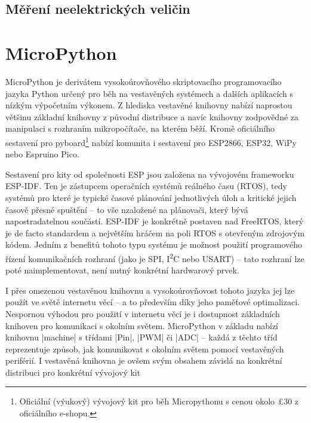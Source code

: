 
\subsection{Měření neelektrických veličin}

\section{MicroPython}\label{sec:micropython}
MicroPython je derivátem vysokoúrovňového skriptovacího programovacího jazyka Python určený pro běh na vestavěných systémech a dalších
aplikacích s nízkým výpočetním výkonem.
Z hlediska vestavěné knihovny nabízí naprostou většinu základní knihovny z původní distribuce a navíc knihovny
zodpovědné za manipulaci s rozhraním mikropočítače, na kterém běží.
Kromě oficiálního sestavení pro pyboard\footnote{Oficiální (výukový) vývojový kit pro běh Micropythonu s
cenou okolo \pounds30 z oficiálního e-shopu.} nabízí komunita i sestavení pro ESP2866, ESP32, WiPy nebo Espruino Pico.

Sestavení pro kity od společnosti ESP jsou založena na vývojovém frameworku ESP-IDF.
Ten je zástupcem operačních systémů reálného času (RTOS), tedy systémů pro které je typické časové plánování jednotlivých úloh
a kritické jejich časově přesné spuštění -- to vše nzaložené na plánovači, který bývá napostradatelnou součástí.
ESP-IDF je konkrétně postaven nad FreeRTOS, který je de facto standardem a největším hráčem na poli RTOS s otevřeným
zdrojovým kódem. 
Jedním z benefitů tohoto typu systému je možnost použití programového řízení komunikačních rozhraní
(jako je SPI, I\textsuperscript{2}C nebo USART) -- tato rozhraní lze poté naimplementovat, není nutný konkrétní hardwarový prvek.

I přes omezenou vestavěnou knihovnu a vysokoúrovňovost tohoto jazyka jej lze použít ve světě internetu věcí --
a to především díky jeho paměťové optimalizaci. Nespornou výhodou pro použití v internetu věcí je i dostupnost základních knihoven
pro komunikaci s okolním světem. MicroPython v základu nabízí knihovnu \ic|machine| s třídami \ic|Pin|, \ic|PWM| či \ic|ADC| --
každá z těchto tříd reprezentuje způsob, jak komunikovat s okolním světem pomocí vestavěných periférií. I vestavěná knihovna
je ovšem svým obsahem závislá na konkrétní distribuci pro konkrétní vývojový kit

